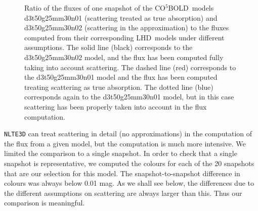 \documentclass[]{aa}
\newcommand{\cobold}{{\sf CO$^5$BOLD}}
\renewcommand{\lhd}{{\sf LHD}}
\begin{document}
\begin{figure}
\centering
{}
\caption{ Ratio of the fluxes of one snapshot of the \cobold\
models d3t50g25mm30n01 (scattering treated as true absorption) and 
d3t50g25mm30n02 (scattering in the \citet{Hayek} approximation) 
to the fluxes computed from
their corresponding \lhd\ models under different assumptions.
The solid line (black) corresponds to the d3t50g25mm30n02 model, 
and the flux has been computed fully taking into account scattering.
The dashed line (red) corresponds to the 
d3t50g25mm30n01 model and the flux has been computed treating scattering
as true absorption. The dotted line (blue) corresponds again to the
d3t50g25mm30n01 model, but in this case scattering has been properly taken into
account in the flux computation.
\label{scattering}}
\end{figure}

{\tt NLTE3D} can treat scattering in detail (no approximations)
in the computation of the flux from a given model, 
but the computation is much more intensive. 
We limited the comparison to a single snapshot. 
In order to check that a single snapshot 
is representative, we computed the colours  for each of the 20 snapshots that are
our selection for this model. The snapshot-to-snapshot difference
in colours was always below 0.01 mag. As we shall see below, the differences
due to the different assumptions on scattering are always larger
than this. Thus our comparison is meaningful. 
\end{document}
